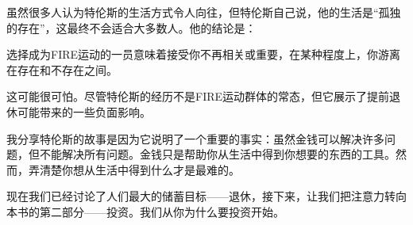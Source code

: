 虽然很多人认为特伦斯的生活方式令人向往，但特伦斯自己说，他的生活是“孤独的存在”，这最终不会适合大多数人。他的结论是：

选择成为FIRE运动的一员意味着接受你不再相关或重要，在某种程度上，你游离在存在和不存在之间。

这可能很可怕。尽管特伦斯的经历不是FIRE运动群体的常态，但它展示了提前退休可能带来的一些负面影响。

我分享特伦斯的故事是因为它说明了一个重要的事实：虽然金钱可以解决许多问题，但不能解决所有问题。金钱只是帮助你从生活中得到你想要的东西的工具。然而，弄清楚你想从生活中得到什么才是最难的。

现在我们已经讨论了人们最大的储蓄目标——退休，接下来，让我们把注意力转向本书的第二部分——投资。我们从你为什么要投资开始。


